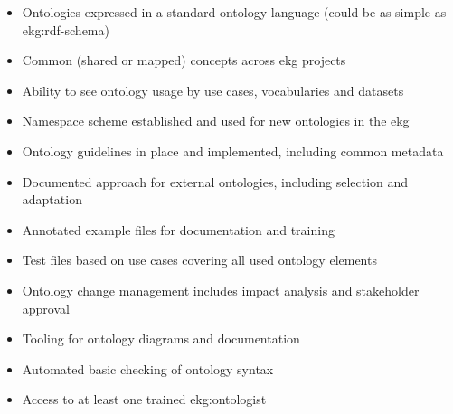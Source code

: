 \ekgmmscoringlevelTwo

\begin{itemize}
    \item Ontologies expressed in a standard ontology language (could be as simple as \gls{ekg:rdf-schema})
    \item Common (shared or mapped) concepts across \gls{ekg} projects
    \item Ability to see ontology usage by use cases, vocabularies and datasets
    \item Namespace scheme established and used for new ontologies in the \gls{ekg}
    \item Ontology guidelines in place and implemented, including common metadata
    \item Documented approach for external ontologies, including selection and adaptation
    \item Annotated example files for documentation and training
    \item Test files based on use cases covering all used ontology elements
    \item Ontology change management includes impact analysis and stakeholder approval
    \item Tooling for ontology diagrams and documentation
    \item Automated basic checking of ontology syntax
    \item Access to at least one trained \gls{ekg:ontologist}
\end{itemize}

\ekgmmscoringlevelThree

